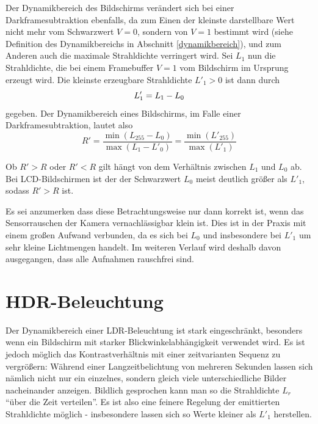      Der Dynamikbereich des Bildschirms verändert sich bei einer Darkframesubtraktion ebenfalls, da zum Einen der kleinste darstellbare Wert nicht mehr vom Schwarzwert $V=0$, sondern von $V=1$ bestimmt wird (siehe Definition des Dynamikbereichs in Abschnitt \ref{dynamikbereich}),
     und zum Anderen auch die maximale Strahldichte verringert wird.
     Sei $L_{1}$ nun die Strahldichte, die bei einem Framebuffer $V=1$ vom Bildschirm im Ursprung erzeugt wird.
     Die kleinste erzeugbare Strahldichte $L'_{1} > 0$ ist dann durch
     \begin{equation}
        L'_{1} = L_{1} - L_0\\
    \end{equation}
    gegeben.
     Der Dynamikbereich eines Bildschirms, im Falle einer Darkframesubtraktion, lautet also 
     \begin{equation}
       R'=\frac{\min{(L_{255}-L_{0})}}{\max{(L_{1}-L'_{0})}} = \frac{\min{(L'_{255})}}{\max{(L'_{1})}}
     \end{equation}

     Ob $R'>R$ oder $R'<R$ gilt hängt von dem Verhältnis zwischen $L_{1}$ und $L_{0}$ ab. 
     Bei LCD-Bildschirmen ist der der Schwarzwert $L_{0}$ meist deutlich größer als $L'_{1}$, sodass $R' > R$ ist. 
     
     Es sei anzumerken dass diese Betrachtungsweise nur dann korrekt ist, wenn das Sensorrauschen der Kamera vernachlässigbar klein ist.
     Dies ist in der Praxis mit einem großen Aufwand verbunden, da es sich bei $L_{0}$ und insbesondere bei $L'_{1}$ um sehr kleine Lichtmengen handelt.
     Im weiteren Verlauf wird deshalb davon ausgegangen, dass alle Aufnahmen rauschfrei sind. 
     


 \section {HDR-Beleuchtung} \label{hdr}

    Der Dynamikbereich einer LDR-Beleuchtung ist stark eingeschränkt, besonders wenn ein Bildschirm mit starker Blickwinkelabhängigkeit verwendet wird.
    Es ist jedoch möglich das Kontrastverhältnis mit einer zeitvarianten Sequenz zu vergrößern:
    Während einer Langzeitbelichtung von mehreren Sekunden lassen sich nämlich nicht nur ein einzelnes, sondern gleich viele unterschiedliche Bilder nacheinander anzeigen.
    Bildlich gesprochen kann man so  die Strahldichte $L_r$ ``über die Zeit verteilen''. 
    Es ist also eine feinere Regelung der emittierten Strahldichte möglich - insbesondere lassen sich so Werte kleiner als  $L'_{1}$ herstellen.
    

